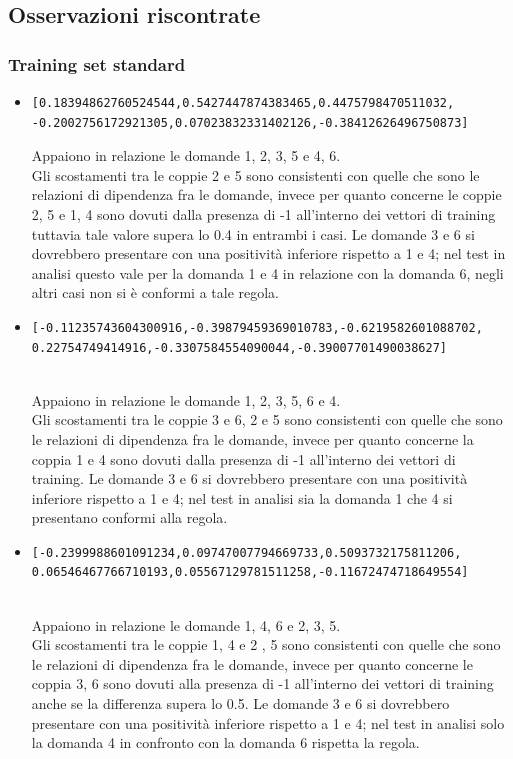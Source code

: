 \documentclass[10pt,a4paper]{article}
\begin{document}
\subsection{Osservazioni riscontrate}
\label{Osservazioni riscontrate}

\subsubsection{Training set standard}
\label{Training set standard su rete a 4 neuroni}
\begin{itemize}
\item \begin{verbatim}[0.18394862760524544,0.5427447874383465,0.4475798470511032,
-0.2002756172921305,0.07023832331402126,-0.38412626496750873] \end{verbatim}
Appaiono in relazione le domande 1, 2, 3, 5 e 4, 6.\\
Gli scostamenti tra le coppie 2 e 5 sono consistenti con quelle che sono le relazioni  di dipendenza fra le domande, invece per quanto concerne le coppie 2, 5 e 1, 4 sono dovuti dalla presenza di -1  all'interno dei vettori di training tuttavia tale valore supera lo 0.4 in entrambi i casi.
Le domande 3 e 6 si dovrebbero presentare con una positivit\`a inferiore rispetto a 1 e 4; nel test in analisi questo vale per la domanda 1 e 4 in relazione con la domanda 6, negli altri casi non si \`e conformi a tale regola.

\item \begin{verbatim}[-0.11235743604300916,-0.39879459369010783,-0.6219582601088702,
0.22754749414916,-0.3307584554090044,-0.39007701490038627] \end{verbatim}\\
Appaiono in relazione le domande 1, 2, 3, 5, 6 e 4.\\
Gli scostamenti tra le coppie 3 e 6, 2 e 5 sono consistenti con quelle che sono le relazioni di dipendenza fra le domande, invece per quanto concerne la coppia 1 e 4 sono dovuti dalla presenza di -1  all'interno dei vettori di training.
Le domande 3 e 6 si dovrebbero presentare con una positivit\`a inferiore rispetto a 1 e 4; nel test in analisi sia la domanda 1 che 4 si presentano conformi alla regola.

\item \begin{verbatim}[-0.2399988601091234,0.09747007794669733,0.5093732175811206,
0.06546467766710193,0.05567129781511258,-0.11672474718649554]\end{verbatim}\\
Appaiono in relazione le domande 1, 4, 6 e 2, 3, 5.\\
Gli scostamenti tra le  coppie 1, 4 e 2 , 5 sono consistenti con quelle che sono le relazioni di dipendenza fra le domande, invece per quanto concerne le coppia 3, 6 sono dovuti alla presenza di -1 all'interno dei vettori di training anche se la differenza supera lo 0.5.
Le domande 3 e 6 si dovrebbero presentare con una positivit\`a inferiore rispetto a 1 e 4; nel test in analisi solo la domanda 4 in confronto con la domanda 6 rispetta la regola.


\end{itemize}
\end{document}
